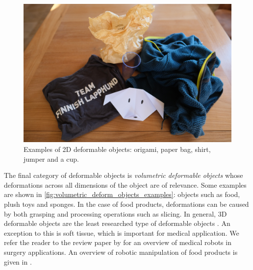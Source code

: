 \begin{figure}[htbp!]
    \centering
    \includegraphics[keepaspectratio,width=\textwidth]{figures/fig_2d_deformables_ex.JPG}
    \caption[Examples of 2D deformable objects]{Examples of 2D deformable objects: origami, paper bag, shirt, jumper and a cup.}
    \label{fig:planar_deform_objects_examples}
\end{figure}

The final category of deformable objects is \textit{volumetric deformable objects} whose deformations across all dimensions of the object are of relevance. Some examples are shown in \cref{fig:volumetric_deform_objects_examples}: objects such as food, plush toys and sponges. In the case of food products, deformations can be caused by both grasping and processing operations such as slicing. In general, 3D deformable objects are the least researched type of deformable objects \autocite{Sanchez2018}. An exception to this is soft tissue, which is important for medical application. We refer the reader to the review paper by \textcite{Taylor2016} for an overview of medical robots in surgery applications. An overview of robotic manipulation of food products is given in \textcite{Chua2003}.

